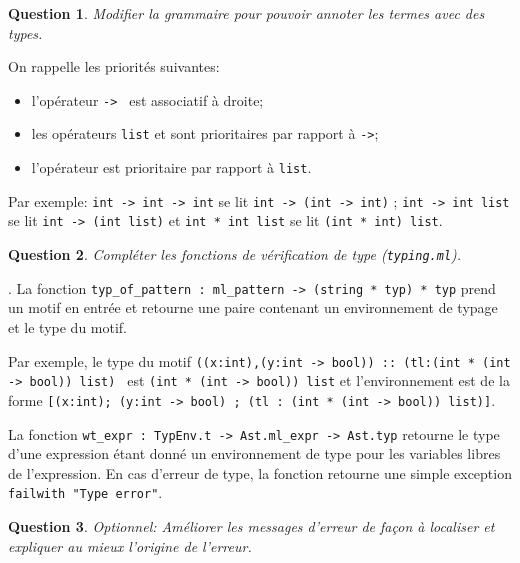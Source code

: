 \documentclass{article}
\newtheorem{question}{Question}[section]
\newcommand{\Question}[1]{\begin{question}#1\end{question}}
\begin{document}
\Question{Modifier la grammaire pour pouvoir annoter les termes avec des types.}
On rappelle les priorités suivantes:
\begin{itemize}
\item l'opérateur {\tt -> } est associatif à droite;
\item les opérateurs {\tt list} et {\tt *} sont prioritaires par rapport à {\tt ->};
\item l'opérateur {\tt *} est prioritaire par rapport à {\tt list}.
\end{itemize}
Par exemple: {\tt int -> int -> int} se lit {\tt int -> (int -> int)} ; {\tt int -> int list} se lit {\tt int -> (int list)} et {\tt int * int list} se lit {\tt (int * int) list}.

\Question{Compléter les fonctions de vérification de type ({\tt typing.ml}).}.
La fonction {\tt typ\_of\_pattern : ml\_pattern -> (string * typ) * typ} prend un motif en entrée et retourne une paire contenant un environnement de
typage et le type du motif. 

Par exemple, le type du motif {\tt ((x:int),(y:int -> bool)) :: (tl:(int * (int -> bool)) list) } est {\tt (int * (int -> bool)) list} et 
l'environnement est de la forme {\tt [(x:int); (y:int -> bool) ; (tl : (int * (int -> bool)) list)]}.

La fonction {\tt wt\_expr : TypEnv.t -> Ast.ml\_expr -> Ast.typ} retourne le type d'une expression
étant donné un environnement de type pour les variables libres de l'expression.
%
En cas d'erreur de type, la fonction retourne une simple exception {\tt failwith "Type error"}.

\Question{Optionnel: Améliorer les messages d'erreur de façon à localiser et expliquer au mieux l'origine de l'erreur.}
\end{document}
